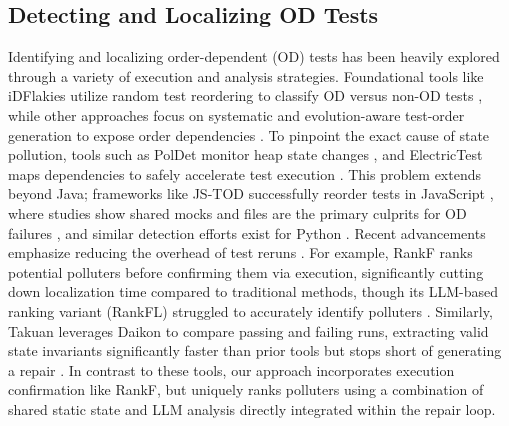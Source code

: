 \documentclass[conference]{IEEEtran}
\begin{document}
\subsection{Detecting and Localizing OD Tests}
Identifying and localizing order-dependent (OD) tests has been heavily explored through a variety of execution and analysis strategies. Foundational tools like iDFlakies utilize random test reordering to classify OD versus non-OD tests \cite{lam2019idflakies}, while other approaches focus on systematic and evolution-aware test-order generation to expose order dependencies \cite{li2022evolution, li2023systematic}. To pinpoint the exact cause of state pollution, tools such as PolDet monitor heap state changes \cite{gyori2015poldet}, and ElectricTest maps dependencies to safely accelerate test execution \cite{bell2015electrictest}. This problem extends beyond Java; frameworks like JS-TOD successfully reorder tests in JavaScript \cite{hashemi2026jstod}, where studies show shared mocks and files are the primary culprits for OD failures \cite{hashemi2025jsod}, and similar detection efforts exist for Python \cite{wang2022ipflakies}. Recent advancements emphasize reducing the overhead of test reruns \cite{iqbal2025reruns}. For example, RankF ranks potential polluters before confirming them via execution, significantly cutting down localization time compared to traditional methods, though its LLM-based ranking variant (RankFL) struggled to accurately identify polluters \cite{rahman2025rankf}. Similarly, Takuan leverages Daikon to compare passing and failing runs, extracting valid state invariants significantly faster than prior tools but stops short of generating a repair \cite{levin2025takuan}. In contrast to these tools, our approach incorporates execution confirmation like RankF, but uniquely ranks polluters using a combination of shared static state and LLM analysis directly integrated within the repair loop.
\end{document}
